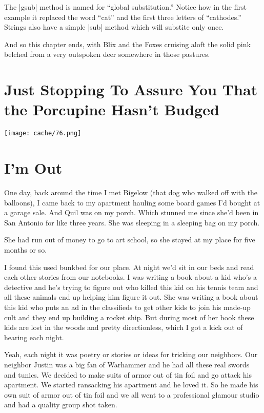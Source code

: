 \documentclass[12pt,twoside]{report}
\begin{document}
The \rubyinline|gsub| method is named for ``global
substitution.''  Notice how in the first example it replaced the word
``cat'' and the first three letters of ``cathodes.''  Strings also
have a simple \rubyinline|sub| method which will
substite only once.

And so this chapter ends, with Blix and the Foxes cruising aloft the
solid pink belched from a very outspoken deer somewhere in those
pastures.

\newpage


\section{Just Stopping To Assure You That the Porcupine Hasn't Budged}


	\texttt{[image: cache/76.png]}


\section{I'm Out}



One day, back around the time I met Bigelow (that dog who walked off
with the balloons), I came back to my apartment hauling some board
games I'd bought at a garage sale.  And Quil was on my porch.  Which
stunned me since she'd been in San Antonio for like three years.  She
was sleeping in a sleeping bag on my porch.

She had run out of money to go to art school, so she stayed at my
place for five months or so.

I found this used bunkbed for our place.  At night we'd sit in our
beds and read each other stories from our notebooks.  I was writing a
book about a kid who's a detective and he's trying to figure out who
killed this kid on his tennis team and all these animals end up
helping him figure it out.  She was writing a book about this kid who
puts an ad in the classifieds to get other kids to join his made-up
cult and they end up building a rocket ship.  But during most of her
book these kids are lost in the woods and pretty directionless, which
I got a kick out of hearing each night.

Yeah, each night it was poetry or stories or ideas for tricking our
neighbors.  Our neighbor Justin was a big fan of Warhammer and he had
all these real swords and tunics.  We decided to make suits of armor
out of tin foil and go attack his apartment.  We started ransacking
his apartment and he loved it.  So he made his own suit of armor out
of tin foil and we all went to a professional glamour studio and had a
quality group shot taken.
\end{document}
